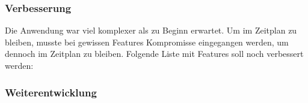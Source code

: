 \subsubsection{Verbesserung}
Die Anwendung war viel komplexer als zu Beginn erwartet. Um im Zeitplan zu bleiben, musste bei gewissen Features  Kompromisse eingegangen werden, um dennoch im Zeitplan zu bleiben. Folgende Liste mit Features soll noch verbessert werden:



\subsubsection{Weiterentwicklung}

\newpage
